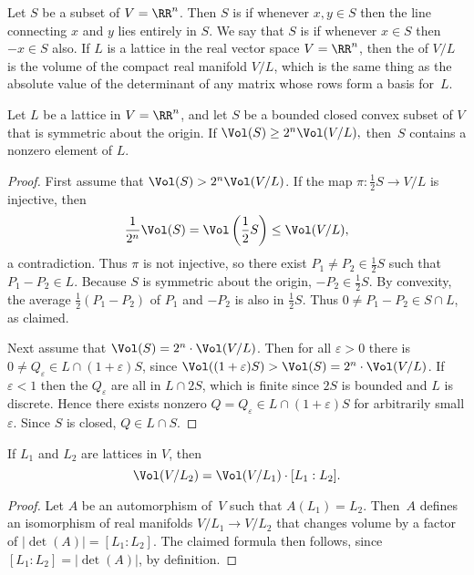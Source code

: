 Let $S$ be a subset of $V=\RR^n$.  Then $S$ is  if
whenever $x,y\in S$ then the line connecting $x$ and $y$ lies entirely
in $S$.  We say that $S$ is  if
whenever $x\in S$ then $-x\in S$ also.  If $L$ is a lattice in the
real vector space $V=\RR^n$, then the  of $V/L$ is the
volume of the compact real manifold $V/L$, which is the same thing as
the absolute value of the determinant of any matrix whose rows form a
basis for~$L$.
\begin{lemma}[Blichfeld]\label{lem:blichfeld}
	Let $L$ be a lattice in $V=\RR^n$, and let $S$ be a
	bounded closed convex subset of $V$ that is symmetric about the
	origin.  If
	$\Vol(S)\geq 2^n \Vol(V/L),$
	then~$S$ contains a nonzero element of $L$.
\end{lemma}
\begin{proof}
	First assume that $\Vol(S)>2^n \Vol(V/L)$.
	If the map $\pi: \frac{1}{2}S \to V/L$ is injective, then
	$$
	\frac{1}{2^n}\Vol(S) = \Vol\left(\frac{1}{2} S\right)\leq \Vol(V/L),
	$$
	a contradiction.  Thus $\pi$ is not injective, so there
	exist $P_1\neq P_2\in \frac{1}{2}S$ such that $P_1-P_2\in L$.
	Because $S$ is symmetric about the origin, $-P_2\in \frac{1}{2}S$.
	By convexity, the average $\frac{1}{2}(P_1-P_2)$ of $P_1$ and $-P_2$
	is also in $\frac{1}{2}S$.  Thus $0 \neq P_1 - P_2 \in S \cap L$,
	as claimed.
	
	Next assume that $\Vol(S) = 2^n\cdot \Vol(V/L)$.  Then for all
	$\varepsilon > 0$ there is $0\neq Q_\varepsilon \in L \cap (1 + \varepsilon) S$,
	since $\Vol((1 + \varepsilon)S) > \Vol(S) = 2^n \cdot \Vol(V/L)$.
	If $\varepsilon < 1$ then the $Q_\varepsilon$ are all in $L \cap 2 S$,
	which is finite since $2S$ is bounded and $L$ is discrete.
	Hence there exists nonzero $Q = Q_\varepsilon \in L\cap (1 + \varepsilon) S$
	for arbitrarily small $\varepsilon$.
	Since $S$ is closed, $Q \in L \cap S$.
\end{proof}

\begin{lemma}\label{lem:latticevolchange}
	If $L_1$ and $L_2$ are lattices in $V$, then
	\[
		\Vol(V/L_2) = \Vol(V/L_1) \cdot [L_1:L_2].
	\]
\end{lemma}
\begin{proof}
	Let $A$ be an automorphism of~$V$ such that $A(L_1)=L_2$.  Then~$A$
	defines an isomorphism of real manifolds $V/L_1\to V/L_2$ that changes
	volume by a factor of $\left|\det(A)\right|=[L_1:L_2]$.
	The claimed formula then follows,
	since $[L_1:L_2] = \left|\det(A)\right|$, by definition.
\end{proof}

